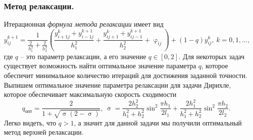 \documentclass[a4paper, 12pt]{report}
\numberwithin{equation}{section}
\renewcommand{\varphi}{\upvarphi}
\renewcommand{\sigma}{\upsigma}
\begin{document}
	\subsubsection{Метод релаксации.}
	Итерационная \textit{формула метода релаксации} имеет вид
	\begin{equation}
		y_{ij}^{k+1} = \dfrac{1}{\frac{2}{h_1^2} + \frac{2}{h_2^2}}\left(\dfrac{y_{i+1 j}^k + y_{i-1j}^{k+1}}{h_1^2} + \dfrac{y_{i j+1}^k + y_{ij-1}^{k+1}}{h_2^2} + \varphi_{ij}\right) + (1-q)y_{ij}^k,\ k = 0,1,\ldots,
	\end{equation}
	где $q$ -- это параметр релаксации, а его значение $q \in [0, 2]$. Для некоторых задач существует возможность найти оптимальное значение параметра $q$, которое обеспечит минимальное количество итераций для достижения заданной точности. Выпишем оптимальное значение параметра релаксации для задачи Дирихле, которое обеспечивает максимальную скорость сходимости
	$$q_{\text{опт}} = \dfrac{2}{1 + \sqrt{\sigma(2-\sigma)}},\ \sigma = \dfrac{2 h_2^2}{h_1 ^2 + h_2^2}\sin^2\dfrac{\pi h_1}{2l_1}+\dfrac{2 h_1^2}{h_1 ^2 + h_2^2}\sin^2\dfrac{\pi h_2}{2l_2}.$$
	Легко видеть, что $q>1$, а значит для данной задачи мы получили оптимальный метод верхней релаксации.
\end{document}
